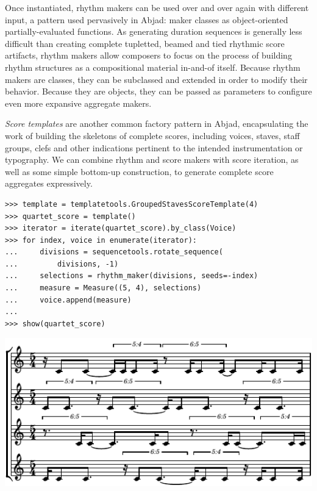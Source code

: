\documentclass{article}
\begin{document}
Once instantiated, rhythm makers can be used over and over again with different
input, a pattern used pervasively in Abjad: maker classes as object-oriented
partially-evaluated functions. As generating duration sequences is generally
less difficult than creating complete tupletted, beamed and tied rhythmic score
artifacts, rhythm makers allow composers to focus on the process of building
rhythm structures as a compositional material in-and-of itself. Because rhythm
makers are classes, they can be subclassed and extended in order to modify
their behavior. Because they are objects, they can be passed as parameters to
configure even more expansive aggregate makers.

\emph{Score templates} are another common factory pattern in Abjad,
encapsulating the work of building the skeletons of complete scores, including
voices, staves, staff groups, clefs and other indications pertinent to the
intended instrumentation or typography. We can combine rhythm and score makers
with score iteration, as well as some simple bottom-up construction, to
generate complete score aggregates expressively.

\begin{lstlisting}
>>> template = templatetools.GroupedStavesScoreTemplate(4)
>>> quartet_score = template()
>>> iterator = iterate(quartet_score).by_class(Voice)
>>> for index, voice in enumerate(iterator):
...     divisions = sequencetools.rotate_sequence(
...         divisions, -1)
...     selections = rhythm_maker(divisions, seeds=-index)
...     measure = Measure((5, 4), selections)
...     voice.append(measure)
...
>>> show(quartet_score)
\end{lstlisting}
\includegraphics{assets/lilypond-f4e67b8cf062f5baa8def83e32bbffd3.pdf}
\end{document}
